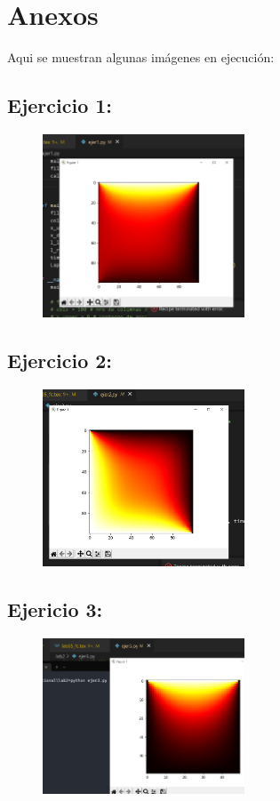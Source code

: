 \documentclass[a4paper,12pt]{article}
\begin{document}
    \section{Anexos}
    Aqui se muestran algunas imágenes en ejecución:
    \subsection{Ejercicio 1:}
    \begin{figure}[h]
        \centering 
        \includegraphics[width=6cm]{ejer1_demostr2.png}
    \end{figure}
	\newpage
    \subsection{Ejercicio 2:}
    \begin{figure}[h]
        \centering 
        \includegraphics[width=6cm]{ejer2_demostr1.png}
    \end{figure}

    \subsection{Ejericio 3:}
    \begin{figure}[h]
        \centering 
        \includegraphics[width=6cm]{eje3_demostr.PNG}
    \end{figure}
    
    
\end{document}
